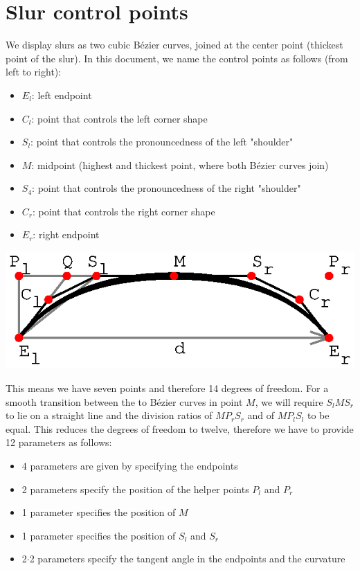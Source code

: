 \documentclass{article}
\begin{document}
\section{Slur control points}

We display slurs as two cubic Bézier curves, joined at the center point (thickest point of the slur).
In this document, we name the control points as follows (from left to right):
\begin{itemize}
\item $E_l$: left endpoint
\item $C_l$: point that controls the left corner shape
\item $S_l$: point that controls the pronouncedness of the left "shoulder"
\item $M$: midpoint (highest and thickest point, where both Bézier curves join)
\item $S_4$: point that controls the pronouncedness of the right "shoulder"
\item $C_r$: point that controls the right corner shape
\item $E_r$: right endpoint
\end{itemize}

\includegraphics{slurCalcIllustration.eps}

This means we have seven points and therefore 14 degrees of freedom.
For a smooth transition between the to Bézier curves in point $M$, we will require $S_l M S_r$ to lie on a straight line
and the division ratios of $M P_r S_r$ and of $M P_l S_l$ to be equal.
This reduces the degrees of freedom to twelve, therefore we have to provide 12 parameters as follows:
\begin{itemize}
\item 4 parameters are given by specifying the endpoints
\item 2 parameters specify the position of the helper points $P_l$ and $P_r$
\item 1 parameter specifies the position of $M$
\item 1 parameter specifies the position of $S_l$ and $S_r$
\item 2$\cdot$2 parameters specify the tangent angle in the endpoints and the curvature
\end{itemize}
\end{document}
